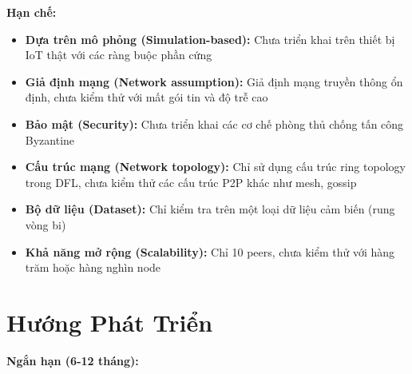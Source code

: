 \textbf{Hạn chế:}

\begin{itemize}
    \item \textbf{Dựa trên mô phỏng (Simulation-based):} Chưa triển khai trên thiết bị IoT thật với các ràng buộc phần cứng
    \item \textbf{Giả định mạng (Network assumption):} Giả định mạng truyền thông ổn định, chưa kiểm thử với mất gói tin và độ trễ cao
    \item \textbf{Bảo mật (Security):} Chưa triển khai các cơ chế phòng thủ chống tấn công Byzantine
    \item \textbf{Cấu trúc mạng (Network topology):} Chỉ sử dụng cấu trúc ring topology trong DFL, chưa kiểm thử các cấu trúc P2P khác như mesh, gossip
    \item \textbf{Bộ dữ liệu (Dataset):} Chỉ kiểm tra trên một loại dữ liệu cảm biến (rung vòng bi)
    \item \textbf{Khả năng mở rộng (Scalability):} Chỉ 10 peers, chưa kiểm thử với hàng trăm hoặc hàng nghìn node
\end{itemize}

\section{Hướng Phát Triển}

\textbf{Ngắn hạn (6-12 tháng):}


